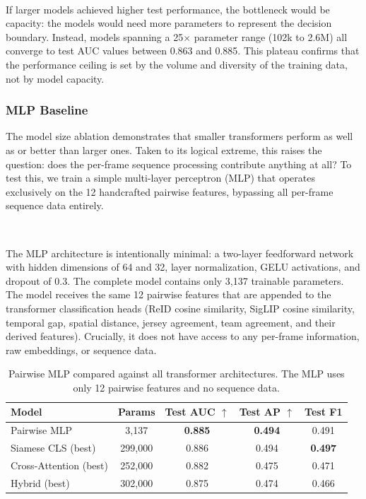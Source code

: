 \

If larger models achieved higher test performance, the bottleneck would be capacity: the models would need more parameters to represent the decision boundary. Instead, models spanning a 25$\times$ parameter range (102k to 2.6M) all converge to test AUC values between 0.863 and 0.885. This plateau confirms that the performance ceiling is set by the volume and diversity of the training data, not by model capacity.


\subsubsection{MLP Baseline}\label{sec:mlp_baseline}
The model size ablation demonstrates that smaller transformers perform as well as or better than larger ones. Taken to its logical extreme, this raises the question: does the per-frame sequence processing contribute anything at all? To test this, we train a simple multi-layer perceptron (MLP) that operates exclusively on the 12 handcrafted pairwise features, bypassing all per-frame sequence data entirely.

\

The MLP architecture is intentionally minimal: a two-layer feedforward network with hidden dimensions of 64 and 32, layer normalization, GELU activations, and dropout of 0.3. The complete model contains only 3{,}137 trainable parameters. The model receives the same 12 pairwise features that are appended to the transformer classification heads (ReID cosine similarity, SigLIP cosine similarity, temporal gap, spatial distance, jersey agreement, team agreement, and their derived features). Crucially, it does not have access to any per-frame information, raw embeddings, or sequence data.

\begin{table}[H]
\centering
\begin{tabular}{lcccc}
\toprule
\textbf{Model} & \textbf{Params} & \textbf{Test AUC $\uparrow$} & \textbf{Test AP $\uparrow$} & \textbf{Test F1} \\
\midrule
Pairwise MLP            & 3{,}137    & \textbf{0.885} & \textbf{0.494} & 0.491 \\
\midrule
Siamese CLS (best)      & 299{,}000  & 0.886 & 0.494 & \textbf{0.497} \\
Cross-Attention (best)   & 252{,}000  & 0.882 & 0.475 & 0.471 \\
Hybrid (best)            & 302{,}000  & 0.875 & 0.474 & 0.466 \\
\bottomrule
\end{tabular}
\caption{Pairwise MLP compared against all transformer architectures. The MLP uses only 12 pairwise features and no sequence data.}
\label{tab:mlp_comparison}
\end{table}

